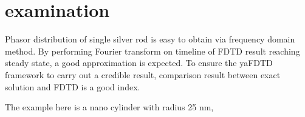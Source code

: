 \section{examination}
Phasor distribution of single silver rod is easy to obtain via frequency domain method. By performing Fourier transform
on timeline of FDTD result reaching steady state, a good approximation is expected. To ensure the yaFDTD framework to
carry out a credible result, comparison result between exact solution and FDTD is a good index.

The example here is a nano cylinder with radius 25 nm, 
